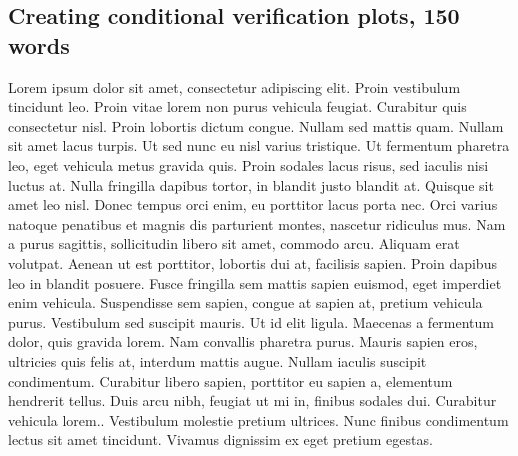 \documentclass[techmemo]{ecmwfrep}%
\begin{document}
\subsection{Creating conditional verification plots, 150 words}
Lorem ipsum dolor sit amet, consectetur adipiscing elit. Proin vestibulum tincidunt leo. Proin vitae lorem non purus vehicula feugiat. Curabitur quis consectetur nisl. Proin lobortis dictum congue. Nullam sed mattis quam. Nullam sit amet lacus turpis. Ut sed nunc eu nisl varius tristique. Ut fermentum pharetra leo, eget vehicula metus gravida quis. Proin sodales lacus risus, sed iaculis nisi luctus at. Nulla fringilla dapibus tortor, in blandit justo blandit at. Quisque sit amet leo nisl. Donec tempus orci enim, eu porttitor lacus porta nec. Orci varius natoque penatibus et magnis dis parturient montes, nascetur ridiculus mus. Nam a purus sagittis, sollicitudin libero sit amet, commodo arcu. Aliquam erat volutpat. Aenean ut est porttitor, lobortis dui at, facilisis sapien. Proin dapibus leo in blandit posuere. Fusce fringilla sem mattis sapien euismod, eget imperdiet enim vehicula. Suspendisse sem sapien, congue at sapien at, pretium vehicula purus. Vestibulum sed suscipit mauris. Ut id elit ligula. Maecenas a fermentum dolor, quis gravida lorem. Nam convallis pharetra purus. Mauris sapien eros, ultricies quis felis at, interdum mattis augue. Nullam iaculis suscipit condimentum. Curabitur libero sapien, porttitor eu sapien a, elementum hendrerit tellus. Duis arcu nibh, feugiat ut mi in, finibus sodales dui. Curabitur vehicula lorem.. Vestibulum molestie pretium ultrices. Nunc finibus condimentum lectus sit amet tincidunt. Vivamus dignissim ex eget pretium egestas.

\end{document}
